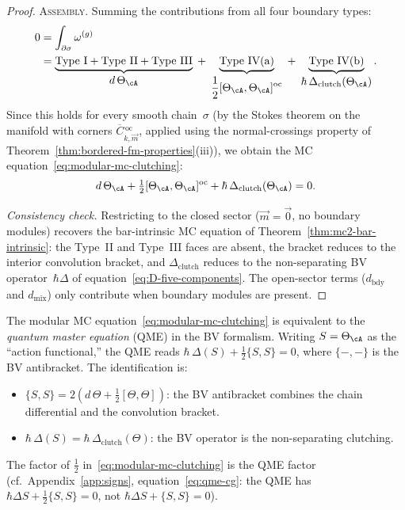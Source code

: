 \begin{proof}
\medskip
\noindent\textsc{Assembly.}
Summing the contributions from all four boundary types:
\begin{align}
0 &= \int_{\partial\sigma} \omega^{(g)} \notag \\
  &= \underbrace{\text{Type~I} + \text{Type~II}
  + \text{Type~III}}_{\displaystyle d\,\Theta_\cA}
  \;+\;
  \underbrace{\text{Type~IV(a)}}_{\displaystyle
  \frac{1}{2}[\Theta_\cA, \Theta_\cA]^{\mathrm{oc}}}
  \;+\;
  \underbrace{\text{Type~IV(b)}}_{\displaystyle
  \hbar\,\Delta_{\mathrm{clutch}}(\Theta_\cA)}.
  \label{eq:stokes-assembly}
\end{align}
Since this holds for every smooth chain~$\sigma$ (by the
Stokes theorem on the manifold with corners
$\overline{C}{}^{\,\mathrm{oc}}_{k,\vec{m}}$,
applied using the normal-crossings property of
Theorem~\ref{thm:bordered-fm-properties}(iii)), we obtain
the MC equation~\eqref{eq:modular-mc-clutching}:
\[
d\,\Theta_\cA
+ \tfrac{1}{2}[\Theta_\cA, \Theta_\cA]^{\mathrm{oc}}
+ \hbar\,\Delta_{\mathrm{clutch}}(\Theta_\cA)
= 0.
\]

\emph{Consistency check.}
Restricting to the closed sector
($\vec{m} = \vec{0}$, no boundary modules) recovers the
bar-intrinsic MC equation of Theorem~\ref{thm:mc2-bar-intrinsic}:
the Type~II and Type~III faces are absent, the bracket reduces
to the interior convolution bracket, and
$\Delta_{\mathrm{clutch}}$ reduces to the non-separating BV
operator~$\hbar\Delta$ of
equation~\eqref{eq:D-five-components}.  The open-sector terms
($d_{\mathrm{bdy}}$ and $d_{\mathrm{mix}}$) only contribute when
boundary modules are present.
\end{proof}

\begin{remark}
\label{rem:qme-vs-mc}
The modular MC equation~\eqref{eq:modular-mc-clutching} is
equivalent to the \emph{quantum master equation} (QME) in the
BV formalism.  Writing $S = \Theta_\cA$ as the ``action
functional,'' the QME reads
$\hbar\,\Delta(S) + \tfrac{1}{2}\{S, S\} = 0$, where
$\{-,-\}$ is the BV antibracket.  The identification is:
\begin{itemize}
\item $\{S, S\} = 2(d\,\Theta + \tfrac{1}{2}[\Theta, \Theta])$:
  the BV antibracket combines the chain differential and the
  convolution bracket.
\item $\hbar\,\Delta(S) = \hbar\,\Delta_{\mathrm{clutch}}(\Theta)$:
  the BV operator is the non-separating clutching.
\end{itemize}
The factor of $\frac{1}{2}$ in~\eqref{eq:modular-mc-clutching}
is the QME factor (cf.\ Appendix~\ref{app:signs}, equation~\eqref{eq:qme-cg}: the QME
has $\hbar\Delta S + \frac{1}{2}\{S, S\} = 0$,
not $\hbar\Delta S + \{S, S\} = 0$).
\end{remark}

